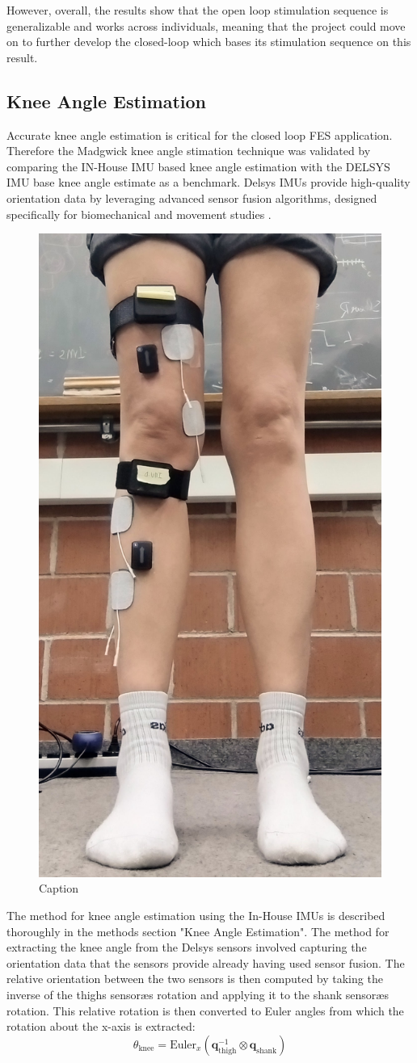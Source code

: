 However, overall, the results show that the open loop stimulation sequence is generalizable and works across individuals, meaning that the project could move on to further develop the closed-loop which bases its stimulation sequence on this result.


\subsection{Knee Angle Estimation}
Accurate knee angle estimation is critical for the closed loop FES application. Therefore the Madgwick knee angle stimation technique was validated by comparing the IN-House IMU based knee angle estimation with the DELSYS IMU base knee angle estimate as a benchmark. Delsys IMUs provide high-quality orientation data by leveraging advanced sensor fusion algorithms, designed specifically for biomechanical and movement studies . 

\begin{figure} 
    \centering
    \includegraphics[width=0.5\linewidth]{images/delsyssetup.jpg}
    \caption{Caption}
    \label{fig:enter-label}
\end{figure}

The method for knee angle estimation using the In-House IMUs is described thoroughly in the methods section "Knee Angle Estimation". The method for extracting the knee angle from the Delsys sensors involved capturing the orientation data that the sensors provide already having used sensor fusion. The relative orientation between the two sensors is then computed by taking the inverse of the thighs sensoræs rotation and applying it to the shank sensoræs rotation. This relative rotation is then converted to Euler angles from which the rotation about the x-axis is extracted:
\begin{equation}
    \theta_{\text{knee}} = \text{Euler}_x \left( \mathbf{q}_{\text{thigh}}^{-1} \otimes \mathbf{q}_{\text{shank}} \right)
\end{equation}

